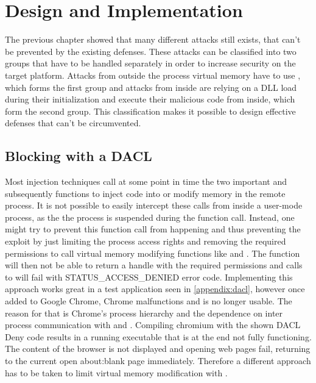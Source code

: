 \section{Design and Implementation}
\label{sec:implementation}
The previous chapter showed that many different attacks still exists, that can't be prevented by the existing defenses. These attacks can be classified into two groups that have to be handled separately in order to increase security on the target platform. Attacks from outside the process virtual memory have to use , which forms the first group and attacks from inside are relying on a DLL load during their initialization and execute their malicious code from inside, which form the second group. This classification makes it possible to design effective defenses that can't be circumvented. 

\subsection{Blocking  with a DACL}
\label{sec:implementation_dacl}
Most injection techniques call at some point in time the two important  and subsequently  functions to inject code into or modify memory in the remote process. It is not possible to easily intercept these calls from inside a user-mode process, as the the process is suspended during the  function call. Instead, one might try to prevent this function call from happening and thus preventing the exploit by just limiting the process access rights and removing the required permissions to call virtual memory modifying functions like  and . The  function will then not be able to return a handle with the required permissions and calls to  will fail with STATUS\_ACCESS\_DENIED error code. Implementing this approach works great in a test application seen in \ref{appendix:dacl}, however once added to Google Chrome, Chrome malfunctions and is no longer usable. The reason for that is Chrome's process hierarchy and the dependence on inter process communication with  and . Compiling chromium with the shown DACL Deny code results in a running executable that is at the end not fully functioning. The content of the browser is not displayed and opening web pages fail, returning to the current open about:blank page immediately. Therefore a different approach has to be taken to limit virtual memory modification with .

